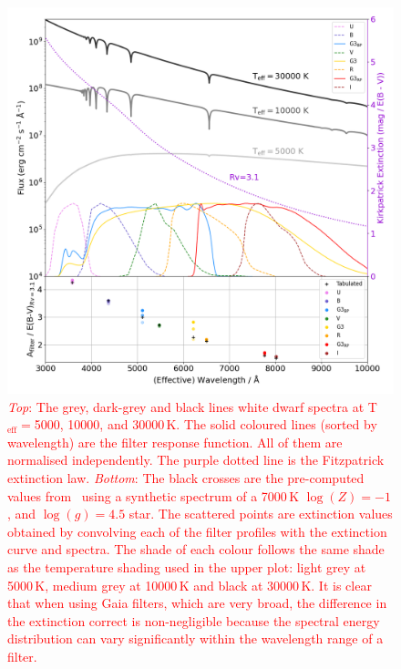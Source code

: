 \documentclass[fleqn,usenatbib]{rasti}
\begin{document}
\begin{figure}
    \centering
    \includegraphics[width=\columnwidth]{fig_12_reddening_filter.png}
    \caption{\textcolor{red}{\textit{Top}: The grey, dark-grey and black lines white dwarf spectra at T$_{\mathrm{eff}}=$5000, 10000, and 30000\,K. The solid coloured lines (sorted by wavelength) are the filter response function. All of them are normalised independently. The purple dotted line is the Fitzpatrick extinction law. \textit{Bottom}: The black crosses are the pre-computed values from~\citet{2011ApJ...737..103S} using a synthetic spectrum of a 7000\,K  $\log(Z) = -1$, and $\log(g) = 4.5$ star. The scattered points are extinction values obtained by convolving each of the filter profiles with the extinction curve and spectra. The shade of each colour follows the same shade as the temperature shading used in the upper plot: light grey at 5000\,K, medium grey at 10000\,K and black at 30000\,K. It is clear that when using Gaia filters, which are very broad, the difference in the extinction correct is non-negligible because the spectral energy distribution can vary significantly within the wavelength range of a filter.}}
    \label{fig:interstellar_reddening}
\end{figure}
\end{document}
